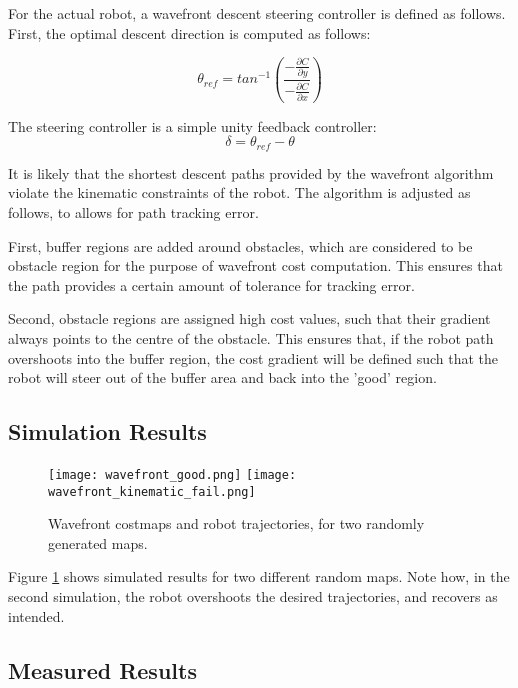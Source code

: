 \documentclass[11pt]{article} %
\begin{document}
For the actual robot, a wavefront descent steering controller is defined as follows.  First, the optimal descent direction is computed as follows:

\begin{equation}
\theta_{ref} = tan^{-1}( \frac{ - \frac{\partial C}{\partial y} }{ - \frac{\partial C}{\partial x} } )
\end{equation}

The steering controller is a simple unity feedback controller:
\begin{equation}
\delta = \theta_{ref} - \theta 
\end{equation}

It is likely that the shortest descent paths provided by the wavefront algorithm violate the kinematic constraints of the robot.  The algorithm is adjusted as follows, to allows for path tracking error.  

First, buffer regions are added around obstacles, which are considered to be obstacle region for the purpose of wavefront cost computation.  This ensures that the path provides a certain amount of tolerance for tracking error.

Second, obstacle regions are assigned high cost values, such that their gradient always points to the centre of the obstacle.  This ensures that, if the robot path overshoots into the buffer region, the cost gradient will be defined such that the robot will steer out of the buffer area and back into the 'good' region.

\subsection{Simulation Results}

\begin{figure}
 \centering
 \texttt{[image: wavefront\_good.png]}
 \texttt{[image: wavefront\_kinematic\_fail.png]}
 \caption{Wavefront costmaps and robot trajectories, for two randomly generated maps.}
 \label{wave_sim}
\end{figure}

Figure \ref{wave_sim} shows simulated results for two different random maps.  Note how, in the second simulation, the robot overshoots the desired trajectories, and recovers as intended.

\clearpage
\subsection{Measured Results}
\end{document}
